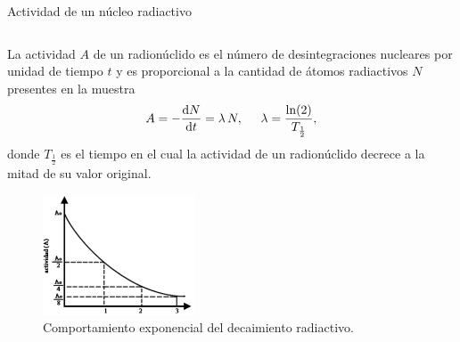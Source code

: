 \documentclass[9pt]{beamer}
\begin{document}
\begin{frame}{Actividad de un núcleo radiactivo}
	\begin{columns}
			\begin{column}{0.68\textwidth}
			\justifying
			La actividad $A$ de un radionúclido es el número de desintegraciones nucleares por unidad de tiempo $t$ y es proporcional a la cantidad de átomos radiactivos $N$ presentes en la muestra
			\begin{equation}
			A = - \dfrac{\text{d}N}{\text{d}t} = \lambda\, N, \hspace{0.5cm} \lambda = \frac{\ln(2)}{T_{\frac{1}{2}}},
			\end{equation}
			donde $T_{\frac{1}{2}}$ es el tiempo en el cual la actividad de un radionúclido decrece a la mitad de su valor original. 
\begin{figure}
\includegraphics[width=0.4\textwidth]{Imagenes/ExponentialDecay.png}
\caption{\justifying Comportamiento exponencial del decaimiento radiactivo.}
\end{figure}			
			

\end{column}
\end{columns}
\end{frame}
\end{document}
